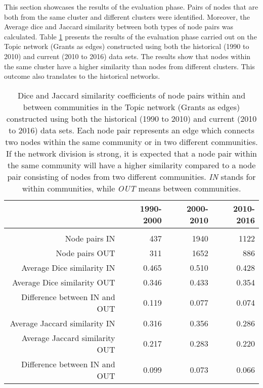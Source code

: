 {This section showcases the results of the evaluation phase. Pairs of nodes that are both from the same cluster and different clusters were identified. Moreover, the Average dice and Jaccard similarity between both types of node pairs was calculated. Table \ref{table:topic_a_evaluation} presents the results of the evaluation phase carried out on the Topic network (Grants as edges) constructed using both the historical (1990 to 2010) and current (2010 to 2016) data sets. The results show that nodes within the same cluster have a higher similarity than nodes from different clusters. This outcome also translates to the historical networks.

\begin{table}[htbp]
\centering
\caption[Dice and Jaccard similarity coefficients of node pairs within and between communities in the Topic network (Grants as edges) constructed using both the historical (1990 to 2010) and current (2010 to 2016) data sets.]{Dice and Jaccard similarity coefficients of node pairs within and between communities in the Topic network (Grants as edges) constructed using both the historical (1990 to 2010) and current (2010 to 2016) data sets. Each node pair represents an edge which connects two nodes within the same community or in two different communities. If the network division is strong, it is expected that a node pair within the same community will have a higher similarity compared to a node pair consisting of nodes from two different communities. \textit{IN} stands for within communities, while \textit{OUT} means between communities.}
\label{table:topic_a_evaluation}
\begin{tabular}{r|rrr}
{} & \textbf{1990-2000} & \textbf{2000-2010} & \textbf{2010-2016}\\
\hline\\
Node pairs IN                  & {437}   & {1940}  & {1122}\\
Node pairs OUT                 & {311}   & {1652}  & {886}\\
Average Dice similarity IN     & {0.465} & {0.510} & {0.428}\\
Average Dice similarity OUT    & {0.346} & {0.433} & {0.354}\\
Difference between IN and OUT  & {0.119} & {0.077} & {0.074}\\
Average Jaccard similarity IN  & {0.316} & {0.356} & {0.286}\\
Average Jaccard similarity OUT & {0.217} & {0.283} & {0.220}\\
Difference between IN and OUT  & {0.099} & {0.073} & {0.066}\\
\end{tabular}
\end{table}

}
